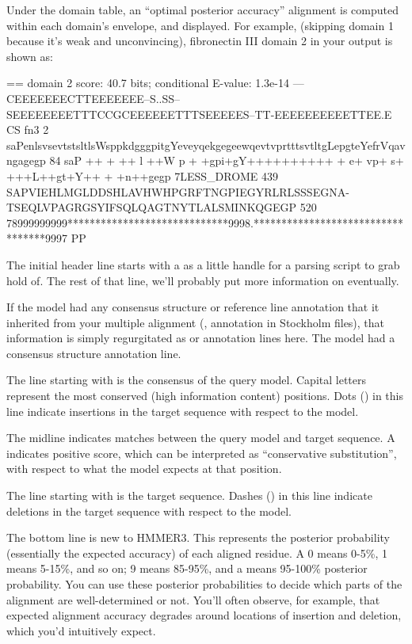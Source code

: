 Under the domain table, an ``optimal posterior accuracy'' alignment
\citep{Holmes98} is computed within each domain's envelope, and
displayed. For example, (skipping domain 1 because it's weak and
unconvincing), fibronectin III domain 2 in your 
output is shown as:

\begin{sreoutput}
 == domain 2    score: 40.7 bits;  conditional E-value: 1.3e-14
                  ---CEEEEEEECTTEEEEEEE--S..SS--SEEEEEEEETTTCCGCEEEEEETTTSEEEEES--TT-EEEEEEEEEETTEE.E CS
          fn3   2 saPenlsvsevtstsltlsWsppkdgggpitgYeveyqekgegeewqevtvprtttsvtltgLepgteYefrVqavngagegp 84 
                  saP   ++ +  ++ l ++W p +  +gpi+gY++++++++++  + e+ vp+   s+ +++L++gt+Y++ +  +n++gegp
  7LESS_DROME 439 SAPVIEHLMGLDDSHLAVHWHPGRFTNGPIEGYRLRLSSSEGNA-TSEQLVPAGRGSYIFSQLQAGTNYTLALSMINKQGEGP 520
                  78999999999*****************************9998.**********************************9997 PP
\end{sreoutput}

The initial header line starts with a \prog{==} as a little handle for
a parsing script to grab hold of. The rest of that line, we'll
probably put more information on eventually.

If the model had any consensus structure or reference line annotation
that it inherited from your multiple alignment (,
 annotation in Stockholm files), that information is
simply regurgitated as  or  annotation lines
here. The  model had a consensus structure annotation line.

The line starting with  is the consensus of the query
model. Capital letters represent the most conserved (high information
content) positions. Dots () in this line indicate insertions
in the target sequence with respect to the model.

The midline indicates matches between the query model and target
sequence. A \prog{+} indicates positive score, which can be
interpreted as ``conservative substitution'', with respect to what the
model expects at that position.

The line starting with  is the target sequence.
Dashes (\prog{-}) in this line indicate deletions in the target
sequence with respect to the model.

The bottom line is new to HMMER3. This represents the posterior
probability (essentially the expected accuracy) of each aligned
residue. A 0 means 0-5\%, 1 means 5-15\%, and so on; 9 means 85-95\%,
and a \prog{*} means 95-100\% posterior probability. You can use these
posterior probabilities to decide which parts of the alignment are
well-determined or not. You'll often observe, for example, that
expected alignment accuracy degrades around locations of insertion and
deletion, which you'd intuitively expect. 

